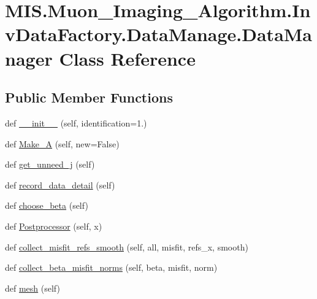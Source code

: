 \hypertarget{classMIS_1_1Muon__Imaging__Algorithm_1_1InvDataFactory_1_1DataManage_1_1DataManager}{}\section{M\+I\+S.\+Muon\+\_\+\+Imaging\+\_\+\+Algorithm.\+Inv\+Data\+Factory.\+Data\+Manage.\+Data\+Manager Class Reference}
\label{classMIS_1_1Muon__Imaging__Algorithm_1_1InvDataFactory_1_1DataManage_1_1DataManager}
\subsection*{Public Member Functions}
\begin{DoxyCompactItemize}
\item 
def \hyperlink{classMIS_1_1Muon__Imaging__Algorithm_1_1InvDataFactory_1_1DataManage_1_1DataManager_a08e7a06b73758e533767c7f48347b05f}{\+\_\+\+\_\+init\+\_\+\+\_\+} (self, identification=1.)
\item 
def \hyperlink{classMIS_1_1Muon__Imaging__Algorithm_1_1InvDataFactory_1_1DataManage_1_1DataManager_aa4059678aa2ec19c5a853de6ebbf459e}{Make\+\_\+A} (self, new=False)
\item 
def \hyperlink{classMIS_1_1Muon__Imaging__Algorithm_1_1InvDataFactory_1_1DataManage_1_1DataManager_a7bcc2ad42cda31c9113784260d62b863}{get\+\_\+unneed\+\_\+j} (self)
\item 
def \hyperlink{classMIS_1_1Muon__Imaging__Algorithm_1_1InvDataFactory_1_1DataManage_1_1DataManager_ad630969a4000fc959c01ad7ca2bef025}{record\+\_\+data\+\_\+detail} (self)
\item 
def \hyperlink{classMIS_1_1Muon__Imaging__Algorithm_1_1InvDataFactory_1_1DataManage_1_1DataManager_a383d58de418e86ca448901724c8acd5d}{choose\+\_\+beta} (self)
\item 
def \hyperlink{classMIS_1_1Muon__Imaging__Algorithm_1_1InvDataFactory_1_1DataManage_1_1DataManager_ad55a7093ce1e5886b03a72a7bd009d2f}{Postprocessor} (self, x)
\item 
def \hyperlink{classMIS_1_1Muon__Imaging__Algorithm_1_1InvDataFactory_1_1DataManage_1_1DataManager_abaca60499be995331dee3513e93a0e34}{collect\+\_\+misfit\+\_\+refs\+\_\+smooth} (self, all, misfit, refs\+\_\+x, smooth)
\item 
def \hyperlink{classMIS_1_1Muon__Imaging__Algorithm_1_1InvDataFactory_1_1DataManage_1_1DataManager_a188460c56ce7ae91311ef23c59732b3b}{collect\+\_\+beta\+\_\+misfit\+\_\+norms} (self, beta, misfit, norm)
\item 
def \hyperlink{classMIS_1_1Muon__Imaging__Algorithm_1_1InvDataFactory_1_1DataManage_1_1DataManager_a70edd6803cb8e01cafb352afe4c5daf4}{mesh} (self)
\end{DoxyCompactItemize}
